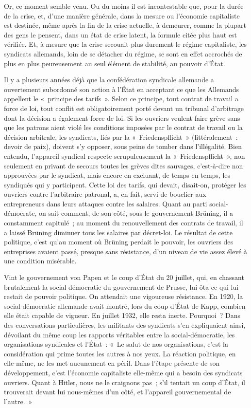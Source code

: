 \documentclass[french,twoside]{book} %
\begin{document}
Or, ce moment semble venu. Ou du moins il est incontestable que, pour la durée de la crise, et, d'une manière générale, dans la mesure ou l'économie capitaliste est destinée, même après la fin de la crise actuelle, à demeurer, comme la plupart des gens le pensent, dans un état de crise latent, la formule citée plus haut est vérifiée. Et, à mesure que la crise secouait plus durement le régime capitaliste, les syndicats allemands, loin de se détacher du régime, se sont en effet accrochés de plus en plus peureusement au seul élément de stabilité, au pouvoir d'État.\par
Il y a plusieurs années déjà que la confédération syndicale allemande a ouvertement subordonné son action à l'État en acceptant ce que les Allemands appellent le « principe des tarifs ». Selon ce principe, tout contrat de travail a force de loi, tout conflit est obligatoirement porté devant un tribunal d'arbi­trage dont la décision a également force de loi. Si les ouvriers veulent faire grève sans que les patrons aient violé les conditions imposées par le contrat de travail ou la décision arbitrale, les syndicats, liés par la « Friedenspflicht » (littéralement : devoir de paix), doivent s'y opposer, sous peine de tomber dans l'illégalité. Bien entendu, l'appareil syndical respecte scrupuleusement la « Friedenspflicht », non seulement en privant de secours toutes les grèves dites sauvages, c'est-à-dire non approuvées par le syndicat, mais encore en excluant, de temps en temps, les syndiqués qui y participent. Cette loi des tarifs, qui devait, disait-on, protéger les ouvriers contre l'arbitraire patronal, a, en fait, servi de bouclier aux entrepreneurs dans leurs attaques contre les salaires. Quant au parti social-démocrate, on sait comment, de son côté, sous le gouvernement Brüning, il a constamment capitulé ; au moment du renou­vellement des contrats de travail, il a laissé Brüning diminuer tous les salaires par décret-loi. Le résultat de cette politique, c'est qu'au moment où Brüning perdait le pouvoir, les ouvriers des entreprises avaient passé, presque sans résistance, d'un niveau de vie assez élevé à une condition misérable.\par
Vint le gouvernement von Papen et le coup d'État du 20 juillet, qui, en chassant brutalement la social-démocratie du gouvernement de Prusse, lui ôta ce qui lui restait de pouvoir politique. On attendait une vigoureuse résistance. En 1920, la social-démocratie allemande avait montré, lors du coup d'État de Kapp, combien elle était capable de vigueur. En juillet 1932, elle resta inerte. Pourquoi ? Dans des conversations particulières, les militants des syndicats s'en expliquaient ainsi, dévoilant du même coup les rapports véritables entre la social-démocratie, les organisations syndicales et l'État : « Le salut de nos organisations, c'est la considération qui prime toutes les autres à nos yeux. La réaction politique, en elle-même, ne les met aucunement en péril. Dans l'étape présente de son développement, c'est l'économie capitaliste elle-même qui a besoin des syndicats ouvriers. Quant à Hitler, nous ne le craignons pas ; s'il tentait un coup d'État, il trouverait devant lui nous-mêmes d'un côté, et l'appareil gouvernemental de l'autre. »\par
\end{document}
